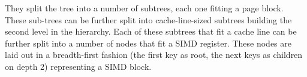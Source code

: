 \documentclass[runningheads,a4paper]{llncs}
\begin{document}
They split the tree into a number of subtrees, each one fitting a page block. These sub-trees can be further split into cache-line-sized subtrees building the second level in the hierarchy. Each of these subtrees that fit a cache line can be further split into a number of nodes that fit a SIMD register. These nodes are laid out in a breadth-first fashion (the first key as root, the next keys as children on depth 2) representing a SIMD block.%
\end{document}
